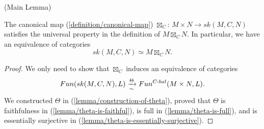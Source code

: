 \begin{lemma} (Main Lemma) \label{lemma/main-lemma}

  \noindent The canonical map (\ref{definition/canonical-map})
  $\boxtimes_{C}$: $M \times N \to sk(M,C,N)$ satisfies the universal property
  in the definition of $M \boxtimes_{C} N$. In particular, we have an
  equivalence of categories
  \[
    sk(M,C,N) \simeq M \boxtimes_{C} N.
  \]
\end{lemma}


\begin{proof}
  We only need to show that $\boxtimes_{C}$ induces an equivalence of categories
  \[
    Fun(sk(M,C,N), L) \xrightarrow[\sim]{\Theta} Fun^{C{\text -}bal}(M \times N, L).
  \]
  We constructed $\Theta$ in (\ref{lemma/construction-of-theta}), proved that
  $\Theta$ is faithfulness in (\ref{lemma/theta-is-faithful}), is full in
  (\ref{lemma/theta-is-full}), and is essentially surjective in
  (\ref{lemma/theta-is-essentially-surjective}).
\end{proof}



